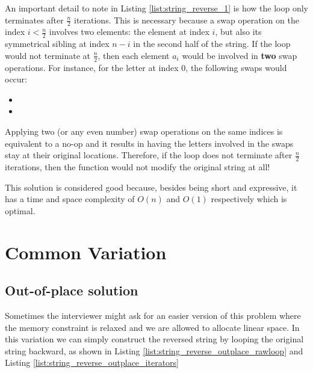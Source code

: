 An important detail to note in Listing \ref{list:string_reverse_1} is how the loop only terminates after $\frac{n}{2}$ iterations.
This is necessary because a swap operation on the index $i<\frac{n}{2}$ involves two elements: the element at index $i$, but also its symmetrical sibling at index $n-i$ in the second half of the string.
If the loop would not terminate at $\frac{n}{2}$, then each element $a_i$ would be involved in \textbf{two} swap operations. 
For instance, for the letter at index $0$, the following swaps would occur:
\begin{itemize}
	\item {}
	\item {}
\end{itemize}
Applying two (or any even number) swap operations on the same indices is equivalent to a no-op and it results in having the letters involved in the swaps stay at their original locations.
Therefore, if the loop does not terminate after $\frac{n}{2}$ iterations, then the function would not modify the original string at all! 

This solution is considered good because, besides being short and expressive, it has a time and space complexity of $O(n)$ and $O(1)$ respectively which is optimal.

\section{Common Variation}
\label{string_reverse:sec:variations}

\subsection{Out-of-place solution}
Sometimes the interviewer might ask for an easier version of this problem where the memory constraint is relaxed and we are allowed to allocate linear space.
In this variation we can simply construct the reversed string by looping the original string backward, as shown in Listing \ref{list:string_reverse_outplace_rawloop} and Listing \ref{list:string_reverse_outplace_iterators}





